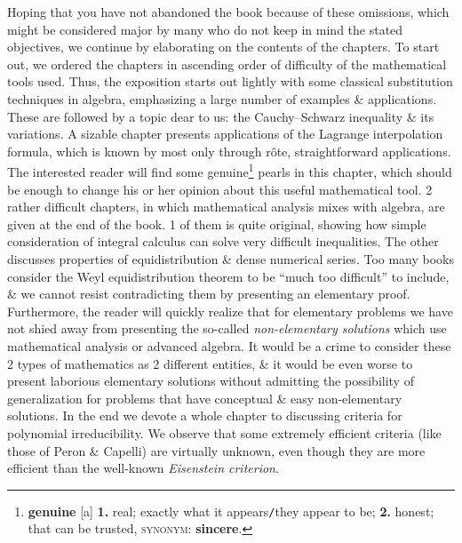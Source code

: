 \documentclass[oneside]{book}
\numberwithin{equation}{section}
\begin{document}
Hoping that you have not abandoned the book because of these omissions, which might be considered major by many who do not keep in mind the stated objectives, we continue by elaborating on the contents of the chapters. To start out, we ordered the chapters in ascending order of difficulty of the mathematical tools used. Thus, the exposition starts out lightly with some classical substitution techniques in algebra, emphasizing a large number of examples \& applications. These are followed by a topic dear to us: the Cauchy--Schwarz inequality \& its variations. A sizable chapter presents applications of the Lagrange interpolation formula, which is known by most only through r\^ote, straightforward applications. The interested reader will find some genuine\footnote{\textbf{genuine} [a] \textbf{1.} real; exactly what it appears\texttt{/}they appear to be; \textbf{2.} honest; that can be trusted, \textsc{synonym}: \textbf{sincere}.} pearls in this chapter, which should be enough to change his or her opinion about this useful mathematical tool. 2 rather difficult chapters, in which mathematical analysis mixes with algebra, are given at the end of the book. 1 of them is quite original, showing how simple consideration of integral calculus can solve very difficult inequalities. The other discusses properties of equidistribution \& dense numerical series. Too many books consider the Weyl equidistribution theorem to be ``much too difficult'' to include, \& we cannot resist contradicting them by presenting an elementary proof. Furthermore, the reader will quickly realize that for elementary problems we have not shied away from presenting the so-called \textit{non-elementary solutions} which use mathematical analysis or advanced algebra. It would be a crime to consider these 2 types of mathematics as 2 different entities, \& it would be even worse to present laborious elementary solutions without admitting the possibility of generalization for problems that have conceptual \& easy non-elementary solutions. In the end we devote a whole chapter to discussing criteria for polynomial irreducibility. We observe that some extremely efficient criteria (like those of Peron \& Capelli) are virtually unknown, even though they are more efficient than the well-known \textit{Eisenstein criterion}.
\end{document}
